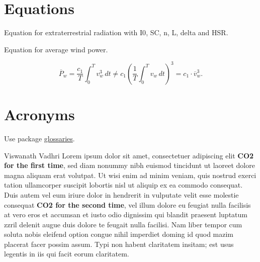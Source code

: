 \printglossary[type=acronym, title=Acronyms, toctitle=Acronyms, style=mystyle]

\printglossary[type=symbolslist, style=mystyle]
\newpage

\setcounter{romanpagenumbers}{\value{page}}


\chapter{Equations}

Equation for extraterrestrial radiation with \gls{I0}, \gls{SC}, \gls{n}, \gls{L}, \gls{delta} and \gls{HSR}.


Equation for average wind power.

\begin{equation}
	\overline P_w = \frac{c_1}{T} \int_0^T v_w^3\,dt \ne c_1 \left(\frac{1}{T}\int_0^T v_w\,dt\right)^3 = c_1 \cdot \overline{v}_w^3.
\end{equation}

\chapter{Acronyms}

Use package \href{ftp://ftp.dante.de/tex-archive/macros/latex/contrib/glossaries/glossariesbegin.pdf}{glossaries}.

 Viswanath Vadhri Lorem ipsum dolor sit amet, consectetuer adipiscing elit \textbf{\gls{CO2} for the first time}, sed diam nonummy nibh euismod tincidunt ut laoreet dolore magna aliquam erat volutpat. Ut wisi enim ad minim veniam, quis nostrud exerci tation ullamcorper suscipit lobortis nisl ut aliquip ex ea commodo consequat. Duis autem vel eum iriure dolor in hendrerit in vulputate velit esse molestie consequat \textbf{\gls{CO2} for the second time}, vel illum dolore eu feugiat nulla facilisis at vero eros et accumsan et iusto odio dignissim qui blandit praesent luptatum zzril delenit augue duis dolore te feugait nulla facilisi. Nam liber tempor cum soluta nobis eleifend option congue nihil imperdiet doming id quod mazim placerat facer possim assum. Typi non habent claritatem insitam; est usus legentis in iis qui facit eorum claritatem. 

